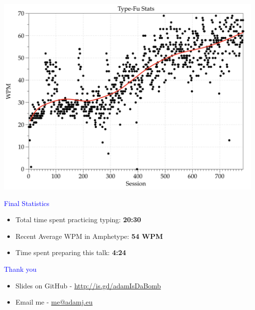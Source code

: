 \documentclass[landscape]{slides}
\begin{document}
\begin{slide}

    \includegraphics[width=\textwidth]{type-fu}

\end{slide}


\begin{slide}

    \textcolor{blue}{\Large{Final Statistics}}

    \begin{itemize}
        \item Total time spent practicing typing: \textbf{20:30}
        \item Recent Average WPM in Amphetype: \textbf{54 WPM}
        \item Time spent preparing this talk: \textbf{4:24}
    \end{itemize}

\end{slide}


\begin{slide}
    \textcolor{blue}{\Large{Thank you}}

    \begin{itemize}
        \item Slides on GitHub - \url{http://is.gd/adamIsDaBomb}
        \item Email me - \url{me@adamj.eu}
    \end{itemize}

\end{slide}
\end{document}
